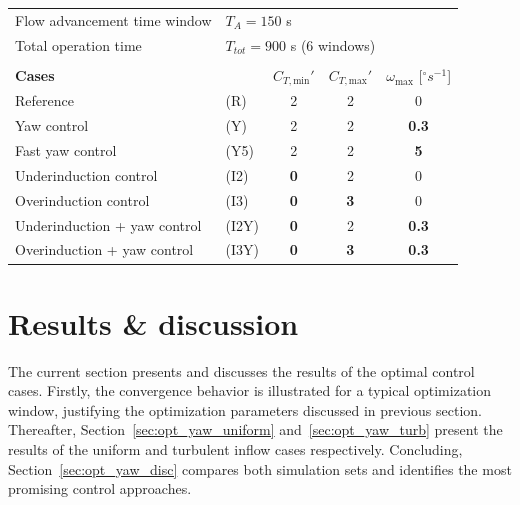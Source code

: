 \begin{table}
\begin{tabular}{llccc}
		Flow advancement time window 	& \multicolumn{4}{l}{$T_A = 150$ s}\\
		Total operation time         	& \multicolumn{4}{l}{$T_{tot} = 900$ s (6 windows)}\\
		& & & & \\	
		\textbf{Cases} & \  & $C_{T,\text{min}}'$ & $C_{T,\text{max}}'$ & $\omega_{\text{max}}$ [$^\circ s^{-1}$] \\ 
		Reference & (R)    &  2 & 2 & 0   \\ 
		Yaw control & (Y)   &  2 & 2 & \textbf{0.3} \\ 
		Fast yaw control & (Y5)   &  2 & 2 &\textbf{5}   \\ 
		Underinduction control & (I2)    &  \textbf{0} & 2 & 0\\
		Overinduction control & (I3)    &  \textbf{0} & \textbf{3} & 0\\ 
		Underinduction + yaw control & (I2Y)   &  \textbf{0} & 2 & \textbf{0.3} \\ 
		Overinduction + yaw control & (I3Y)   &  \textbf{0} & \textbf{3} & \textbf{0.3} \\ 
		\hline 
	\end{tabular} 
\end{table}









\section{Results \& discussion}\label{sec:opt_yaw_results}
The current section presents and discusses the results of the optimal control cases. Firstly, the convergence behavior is illustrated for a typical optimization window, justifying the optimization parameters discussed in previous section. Thereafter, Section~\ref{sec:opt_yaw_uniform} and~\ref{sec:opt_yaw_turb} present the results of the uniform and turbulent inflow cases respectively. Concluding, Section~\ref{sec:opt_yaw_disc} compares both simulation sets and identifies the most promising control approaches.


